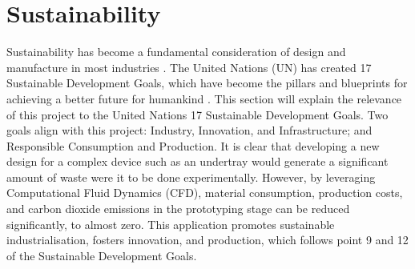\section{Sustainability}

\noindent Sustainability has become a fundamental consideration of design and manufacture in most industries \cite{Gates2021HowDisaster}. The United Nations (UN) has created 17 Sustainable Development Goals, which have become the pillars and blueprints for achieving a better future for humankind \cite{UNITEDNATIONS}. This section will explain the relevance of this project to the United Nations 17 Sustainable Development Goals. Two goals align with this project: Industry, Innovation, and Infrastructure; and Responsible Consumption and Production. It is clear that developing a new design for a complex device such as an undertray would generate a significant amount of waste were it to be done experimentally. However, by leveraging Computational Fluid Dynamics (CFD), material consumption, production costs, and carbon dioxide emissions in the prototyping stage can be reduced significantly, to almost zero. This application promotes sustainable industrialisation, fosters innovation, and production, which follows point 9 and 12 of the Sustainable Development Goals.

